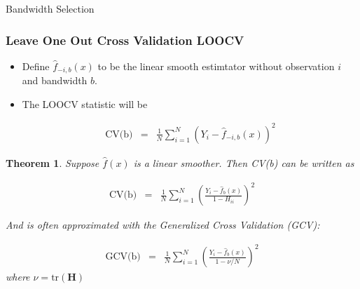 \documentclass{beamer}
\newtheorem{thm}{Theorem}
\numberwithin{equation}{section}
\begin{document}
\begin{frame}

\huge 

Bandwidth Selection


\end{frame}

\begin{frame}
\frametitle{Leave One Out Cross Validation LOOCV}

\begin{itemize}
\item Define $\hat{f}_{-i,b}(x)$ to be the linear smooth estimtator without observation $i$ and bandwidth $b$.  
\item The LOOCV statistic will be 

\begin{eqnarray}
\text{CV(b)} & = & \frac{1}{N} \sum_{i=1}^{N}\left(Y_{i} - \hat{f}_{-i,b}(x)  \right)^2 \nonumber 
\end{eqnarray}
\end{itemize}





\end{frame}

\begin{frame}

\begin{thm}
Suppose $\hat{f}(x)$ is a linear smoother.  Then CV(b) can be written as 

\begin{eqnarray}
\text{CV(b)} & = & \frac{1}{N} \sum_{i=1}^{N}\left( \frac{Y_{i} - \hat{f}_{b} (x)}{1 - H_{ii}}  \right)^2 \nonumber 
\end{eqnarray}

And is often approximated with the Generalized Cross Validation (GCV): 

\begin{eqnarray}
\text{GCV(b)} & = & \frac{1}{N} \sum_{i=1}^{N}\left( \frac{Y_{i} - \hat{f}_{b} (x)}{1 - \nu/N}  \right)^2 \nonumber 
\end{eqnarray}
where $\nu = \text{tr}(\boldsymbol{H})$

\end{thm}



\end{frame}


\begin{frame}






\end{frame}
\end{document}
